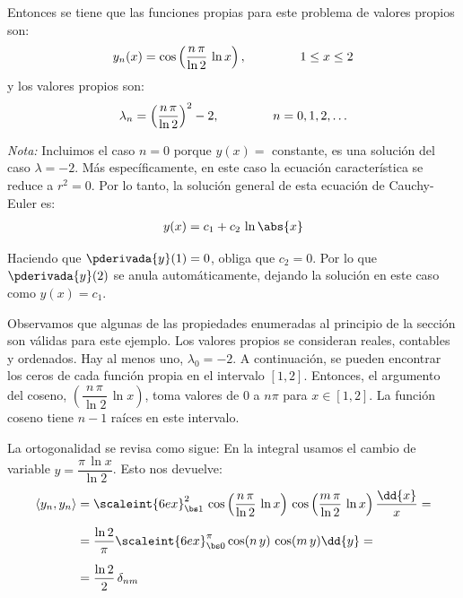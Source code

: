 \begin{ejemplo}
Entonces se tiene que las funciones propias para este problema de valores propios son:
\begin{align*}
y_{n}(x) = \cos \left( \dfrac{n \, \pi}{\ln 2} \, \ln x \right), \hspace{1.5cm} 1 \leq x \leq 2
\end{align*}
y los valores propios son:
\begin{align*}
\lambda_{n} = \left( \dfrac{n \, \pi}{\ln 2} \right)^{2} - 2, \hspace{1.5cm} n = 0, 1, 2, \ldots
\end{align*}

\emph{Nota:} Incluimos el caso $n = 0$ porque $y (x) =$ constante, es una solución del caso $\lambda = - 2$. Más específicamente, en este caso la ecuación característica se reduce a $r^{2} = 0$. Por lo tanto, la solución general de esta ecuación de Cauchy-Euler es:
\begin{align*}
y (x) = c_{1} + c_{2} \, \ln \abs{x}
\end{align*}

Haciendo que $\pderivada{y} (1) = 0$, obliga que $c_{2} = 0$. Por lo que $\pderivada{y} (2)$ se anula automáticamente, dejando la solución en este caso como $y(x) = c_{1}$.
\par
Observamos que algunas de las propiedades enumeradas al principio de la sección son válidas para este ejemplo. Los valores propios se consideran reales, contables y ordenados. Hay al menos uno, $\lambda_{0} = -2$. A continuación, se pueden encontrar los ceros de cada función propia en el intervalo $[1, 2]$. Entonces, el argumento del coseno, $\left( \dfrac{n \, \pi}{\ln 2} \, \ln x \right)$, toma valores de $0$ a $n \pi$ para $x \in [1, 2]$. La función coseno tiene $n - 1$ raíces en este intervalo.
\par
La ortogonalidad se revisa como sigue: En la integral usamos el cambio de variable $y = \dfrac{\pi \, \ln x}{\ln 2}$. Esto nos devuelve:
\begin{align}
\begin{aligned}[b]
\langle y_{n}, y_{n} \rangle &= \scaleint{6ex}_{\bs 1}^{2} \, \cos \left( \dfrac{n \, \pi}{\ln 2} \, \ln x \right) \, \cos \left( \dfrac{m \, \pi}{\ln 2} \, \ln x \right) \dfrac{\dd{x}}{x} = \\[0.5em]
&= \dfrac{\ln 2}{\pi} \scaleint{6ex}_{\bs 0}^{\pi} \cos (n \, y) \, \cos (m \, y) \dd{y} = \\[0.5em]
&= \dfrac{\ln 2}{2} \, \delta_{nm}
\end{aligned}
\label{eq:ecuacion_04_16}
\end{align}
\end{ejemplo}


